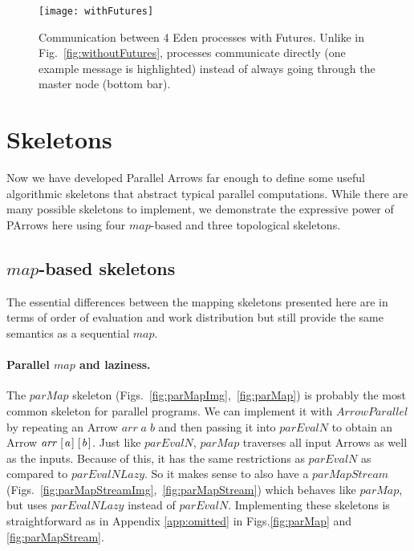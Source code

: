\documentclass{jfp1}
\newcommand{\Conid}[1]{\mathit{#1}}
\newcommand{\Varid}[1]{\mathit{#1}}
\begin{document}
\begin{figure}[ht]
	\centering
	\texttt{[image: withFutures]}
	\caption[with Futures]{Communication between 4 Eden processes with Futures. Unlike in Fig.~\ref{fig:withoutFutures}, processes communicate directly (one example message is highlighted) instead of always going through the master node (bottom bar).}
	\label{fig:withFutures}
\end{figure}
	\section{Skeletons}
\label{sec:skeletons}
Now we have developed Parallel Arrows far enough to define some useful algorithmic skeletons that abstract typical parallel computations. While there are many possible skeletons to implement, we demonstrate the expressive power of PArrows here using four \ensuremath{\Varid{map}}-based and three topological skeletons.
\subsection{\ensuremath{\Varid{map}}-based skeletons}
\label{sec:map-skeletons}
The essential differences between the mapping skeletons presented here are in terms of order of evaluation and work distribution but still provide the same semantics as a sequential \ensuremath{\Varid{map}}.

\paragraph{Parallel \ensuremath{\Varid{map}} and laziness.}
The \ensuremath{\Varid{parMap}} skeleton (Figs.~\ref{fig:parMapImg},~\ref{fig:parMap}) is probably the most common skeleton for parallel programs. We can implement it with \ensuremath{\Conid{ArrowParallel}} by repeating an Arrow \ensuremath{\Varid{arr}\;\Varid{a}\;\Varid{b}} and then passing it into \ensuremath{\Varid{parEvalN}} to obtain an Arrow \ensuremath{\Varid{arr}\;[\mskip1.5mu \Varid{a}\mskip1.5mu]\;[\mskip1.5mu \Varid{b}\mskip1.5mu]}.
Just like \ensuremath{\Varid{parEvalN}}, \ensuremath{\Varid{parMap}} traverses all input Arrows as well as the inputs.
Because of this, it has the same restrictions as \ensuremath{\Varid{parEvalN}} as compared to \ensuremath{\Varid{parEvalNLazy}}. So it makes sense to also have a \ensuremath{\Varid{parMapStream}} (Figs.~\ref{fig:parMapStreamImg},~\ref{fig:parMapStream}) which behaves like \ensuremath{\Varid{parMap}}, but uses \ensuremath{\Varid{parEvalNLazy}} instead of \ensuremath{\Varid{parEvalN}}. Implementing these skeletons is straightforward as in Appendix \ref{app:omitted} in Figs.\ref{fig:parMap} and \ref{fig:parMapStream}.
\end{document}
